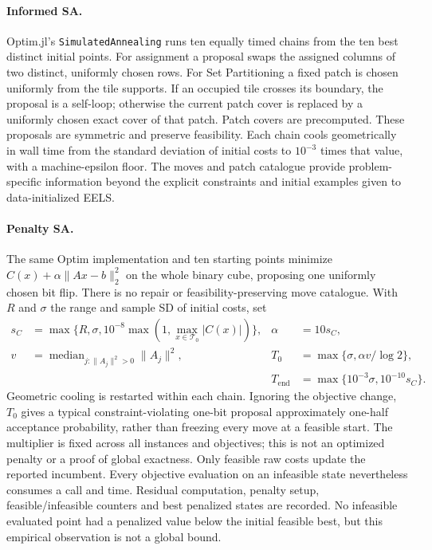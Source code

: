 \paragraph{Informed SA.}
Optim.jl's \texttt{SimulatedAnnealing} runs ten equally timed chains from the
ten best distinct initial points. For assignment a proposal swaps the assigned
columns of two distinct, uniformly chosen rows. For Set Partitioning a fixed
patch is chosen uniformly from the tile supports. If an occupied tile crosses
its boundary, the proposal is a self-loop; otherwise the current patch cover
is replaced by a uniformly chosen exact cover of that patch. Patch covers
are precomputed. These proposals are symmetric and preserve feasibility.
Each chain cools geometrically in wall time from the standard deviation of
initial costs to $10^{-3}$ times that value, with a machine-epsilon floor.
The moves and patch catalogue provide problem-specific information beyond
the explicit constraints and initial examples given to data-initialized EELS.

\paragraph{Penalty SA.}
The same Optim implementation and ten starting points minimize
$C(x)+\alpha\|Ax-b\|_2^2$ on the whole binary cube, proposing one uniformly
chosen bit flip. There is no repair or feasibility-preserving move catalogue.
With $R$ and $\sigma$ the range and sample SD of initial costs, set
\begin{align}
s_C&=\max\{R,\sigma,10^{-8}\max(1,\max_{x\in\mathcal T_0}|C(x)|)\},
&\alpha&=10s_C,\\
v&=\operatorname{median}_{j:\|A_j\|^2>0}\|A_j\|^2,
&T_0&=\max\{\sigma,\alpha v/\log2\},\\
&&T_{\mathrm{end}}&=\max\{10^{-3}\sigma,10^{-10}s_C\}.
\end{align}
Geometric cooling is restarted within each chain. Ignoring the objective
change, $T_0$ gives a typical constraint-violating one-bit proposal approximately
one-half acceptance probability, rather than freezing every move at a feasible
start. The multiplier is fixed across all instances and objectives; this is not
an optimized penalty or a proof of global exactness. Only feasible raw costs
update the reported incumbent. Every objective evaluation on an infeasible
state nevertheless consumes a call and time. Residual computation, penalty
setup, feasible/infeasible counters and best penalized states are recorded.
No infeasible evaluated point had a penalized value below the initial feasible
best, but this empirical observation is not a global bound.

